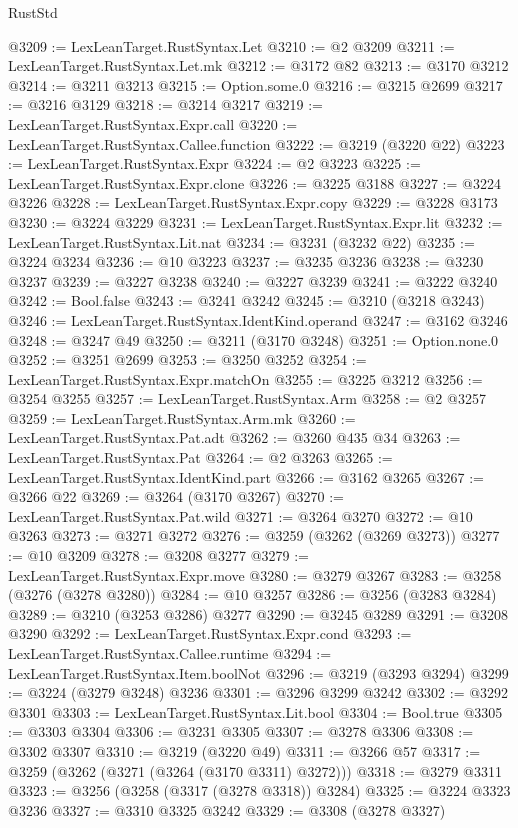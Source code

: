 \begin{lexlean}{RustStd}
\begin{coremodule}
@3209 := LexLeanTarget.RustSyntax.Let
@3210 := @2 @3209
@3211 := LexLeanTarget.RustSyntax.Let.mk
@3212 := @3172 @82
@3213 := @3170 @3212
@3214 := @3211 @3213
@3215 := Option.some.{0}
@3216 := @3215 @2699
@3217 := @3216 @3129
@3218 := @3214 @3217
@3219 := LexLeanTarget.RustSyntax.Expr.call
@3220 := LexLeanTarget.RustSyntax.Callee.function
@3222 := @3219 (@3220 @22)
@3223 := LexLeanTarget.RustSyntax.Expr
@3224 := @2 @3223
@3225 := LexLeanTarget.RustSyntax.Expr.clone
@3226 := @3225 @3188
@3227 := @3224 @3226
@3228 := LexLeanTarget.RustSyntax.Expr.copy
@3229 := @3228 @3173
@3230 := @3224 @3229
@3231 := LexLeanTarget.RustSyntax.Expr.lit
@3232 := LexLeanTarget.RustSyntax.Lit.nat
@3234 := @3231 (@3232 @22)
@3235 := @3224 @3234
@3236 := @10 @3223
@3237 := @3235 @3236
@3238 := @3230 @3237
@3239 := @3227 @3238
@3240 := @3227 @3239
@3241 := @3222 @3240
@3242 := Bool.false
@3243 := @3241 @3242
@3245 := @3210 (@3218 @3243)
@3246 := LexLeanTarget.RustSyntax.IdentKind.operand
@3247 := @3162 @3246
@3248 := @3247 @49
@3250 := @3211 (@3170 @3248)
@3251 := Option.none.{0}
@3252 := @3251 @2699
@3253 := @3250 @3252
@3254 := LexLeanTarget.RustSyntax.Expr.matchOn
@3255 := @3225 @3212
@3256 := @3254 @3255
@3257 := LexLeanTarget.RustSyntax.Arm
@3258 := @2 @3257
@3259 := LexLeanTarget.RustSyntax.Arm.mk
@3260 := LexLeanTarget.RustSyntax.Pat.adt
@3262 := @3260 @435 @34
@3263 := LexLeanTarget.RustSyntax.Pat
@3264 := @2 @3263
@3265 := LexLeanTarget.RustSyntax.IdentKind.part
@3266 := @3162 @3265
@3267 := @3266 @22
@3269 := @3264 (@3170 @3267)
@3270 := LexLeanTarget.RustSyntax.Pat.wild
@3271 := @3264 @3270
@3272 := @10 @3263
@3273 := @3271 @3272
@3276 := @3259 (@3262 (@3269 @3273))
@3277 := @10 @3209
@3278 := @3208 @3277
@3279 := LexLeanTarget.RustSyntax.Expr.move
@3280 := @3279 @3267
@3283 := @3258 (@3276 (@3278 @3280))
@3284 := @10 @3257
@3286 := @3256 (@3283 @3284)
@3289 := @3210 (@3253 @3286) @3277
@3290 := @3245 @3289
@3291 := @3208 @3290
@3292 := LexLeanTarget.RustSyntax.Expr.cond
@3293 := LexLeanTarget.RustSyntax.Callee.runtime
@3294 := LexLeanTarget.RustSyntax.Item.boolNot
@3296 := @3219 (@3293 @3294)
@3299 := @3224 (@3279 @3248) @3236
@3301 := @3296 @3299 @3242
@3302 := @3292 @3301
@3303 := LexLeanTarget.RustSyntax.Lit.bool
@3304 := Bool.true
@3305 := @3303 @3304
@3306 := @3231 @3305
@3307 := @3278 @3306
@3308 := @3302 @3307
@3310 := @3219 (@3220 @49)
@3311 := @3266 @57
@3317 := @3259 (@3262 (@3271 (@3264 (@3170 @3311) @3272)))
@3318 := @3279 @3311
@3323 := @3256 (@3258 (@3317 (@3278 @3318)) @3284)
@3325 := @3224 @3323 @3236
@3327 := @3310 @3325 @3242
@3329 := @3308 (@3278 @3327)

\end{coremodule}
\end{lexlean}
